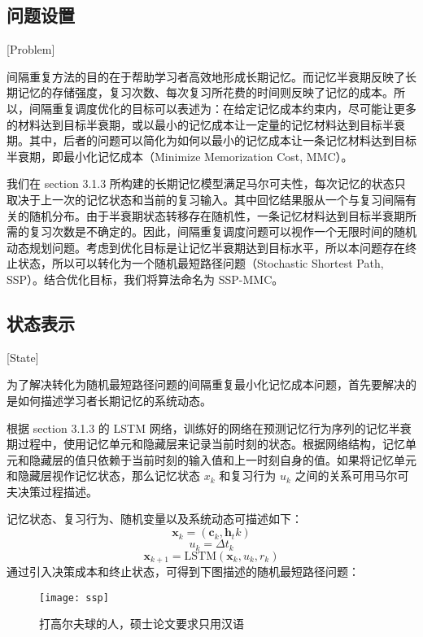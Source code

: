 \subsection{问题设置}[Problem]

间隔重复方法的目的在于帮助学习者高效地形成长期记忆。而记忆半衰期反映了长期记忆的存储强度，复习次数、每次复习所花费的时间则反映了记忆的成本。所以，间隔重复调度优化的目标可以表述为：在给定记忆成本约束内，尽可能让更多的材料达到目标半衰期，或以最小的记忆成本让一定量的记忆材料达到目标半衰期。其中，后者的问题可以简化为如何以最小的记忆成本让一条记忆材料达到目标半衰期，即最小化记忆成本（Minimize Memorization Cost, MMC）。

我们在 section 3.1.3 所构建的长期记忆模型满足马尔可夫性，每次记忆的状态只取决于上一次的记忆状态和当前的复习输入。其中回忆结果服从一个与复习间隔有关的随机分布。由于半衰期状态转移存在随机性，一条记忆材料达到目标半衰期所需的复习次数是不确定的。因此，间隔重复调度问题可以视作一个无限时间的随机动态规划问题。考虑到优化目标是让记忆半衰期达到目标水平，所以本问题存在终止状态，所以可以转化为一个随机最短路径问题（Stochastic Shortest Path, SSP）。结合优化目标，我们将算法命名为 SSP-MMC。

\subsection{状态表示}[State]

为了解决转化为随机最短路径问题的间隔重复最小化记忆成本问题，首先要解决的是如何描述学习者长期记忆的系统动态。

根据 section 3.1.3 的 LSTM 网络，训练好的网络在预测记忆行为序列的记忆半衰期过程中，使用记忆单元和隐藏层来记录当前时刻的状态。根据网络结构，记忆单元和隐藏层的值只依赖于当前时刻的输入值和上一时刻自身的值。如果将记忆单元和隐藏层视作记忆状态，那么记忆状态 $x_k$ 和复习行为 $u_k$ 之间的关系可用马尔可夫决策过程描述。

记忆状态、复习行为、随机变量以及系统动态可描述如下：
\begin{equation}
\boldsymbol x_k = (\boldsymbol c_k,\boldsymbol h_tk)
\end{equation}
\begin{equation}
u_{k}=\Delta t_{k}
\end{equation}
\begin{equation}
\boldsymbol x_{k+1}=\mathrm{LSTM}(\boldsymbol x_k,u_k,r_k)
\end{equation}
通过引入决策成本和终止状态，可得到下图描述的随机最短路径问题：

\begin{figure}[htpb]
    \centering
    \texttt{[image: ssp]}
    \caption{打高尔夫球的人，硕士论文要求只用汉语}
\end{figure}

